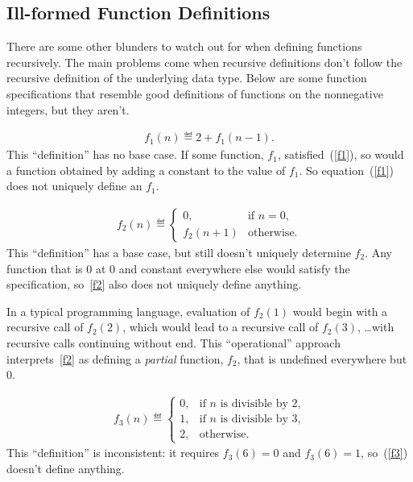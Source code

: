 \subsection{Ill-formed Function Definitions}

There are some other blunders to watch out for when defining functions
recursively.  The main problems come when recursive definitions don't
follow the recursive definition of the underlying data type.  Below are
some function specifications that resemble good definitions of functions
on the nonnegative integers, but they aren't.

\begin{eqnarray}\label{f1}
f_1(n)\eqdef 2+f_1(n-1).
\end{eqnarray}
This ``definition'' has no base case.  If some function, $f_1$,
satisfied~(\ref{f1}), so would a function obtained by adding a constant to
the value of $f_1$.  So equation~(\ref{f1}) does not uniquely define
an $f_1$.

\begin{eqnarray}\label{f2}
f_2(n) \eqdef
\begin{cases}
 0, & \text{if $n=0$},\\
 f_2(n+1) &  \text{otherwise}.
\end{cases}
\end{eqnarray}
This ``definition'' has a base case, but still doesn't uniquely determine
$f_2$.  Any function that is 0 at 0 and constant everywhere else would
satisfy the specification, so~\eqref{f2} also does not uniquely define
anything.

In a typical programming language, evaluation of $f_2(1)$ would begin with
a recursive call of $f_2(2)$, which would lead to a recursive call of
$f_2(3)$, \dots with recursive calls continuing without end.  This
``operational'' approach interprets~\eqref{f2} as defining a
\emph{partial} function, $f_2$, that is undefined everywhere but 0.

\begin{eqnarray}\label{f3}
f_3(n) \eqdef \begin{cases}
  0, &  \text{if $n$ is divisible by 2,}\\
  1, &  \text{if $n$ is divisible by 3,}\\
  2, & \text{otherwise.}
 \end{cases}
\end{eqnarray}
This ``definition'' is inconsistent: it requires $f_3(6) = 0$ and $f_3(6)
=1$, so~(\ref{f3}) doesn't define anything.

